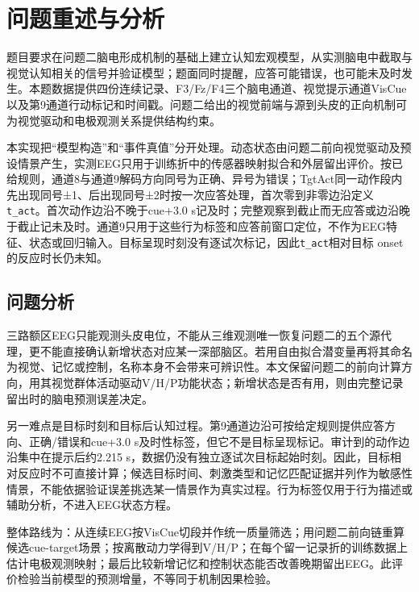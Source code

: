 \hypertarget{ux95eeux9898ux91cdux8ff0ux4e0eux5206ux6790}{%
\section{问题重述与分析}\label{ux95eeux9898ux91cdux8ff0ux4e0eux5206ux6790}}

题目要求在问题二脑电形成机制的基础上建立认知宏观模型，从实测脑电中截取与视觉认知相关的信号并验证模型；题面同时提醒，应答可能错误，也可能未及时发生\cite{problem2026}。本题数据提供四份连续记录、F3/Fz/F4三个脑电通道、视觉提示通道VisCue以及第9通道行动标记和时间戳。问题二给出的视觉前端与源到头皮的正向机制可为视觉驱动和电极观测关系提供结构约束。

本实现把``模型构造''和``事件真值''分开处理。动态状态由问题二前向视觉驱动及预设情景产生，实测EEG只用于训练折中的传感器映射拟合和外层留出评价。按已给规则，通道8与通道9解码方向同号为正确、异号为错误；TgtAct同一动作段内先出现同号±1、后出现同号±2时按一次应答处理，首次零到非零边沿定义\texttt{t\_act}。首次动作边沿不晚于cue+3.0 s记及时；完整观察到截止而无应答或边沿晚于截止记未及时。通道9只用于这些行为标签和应答前窗口定位，不作为EEG特征、状态或回归输入。目标呈现时刻没有逐试次标记，因此\texttt{t\_act}相对目标 onset 的反应时长仍未知。

\hypertarget{ux95eeux9898ux5206ux6790}{%
\subsection{问题分析}\label{ux95eeux9898ux5206ux6790}}

三路额区EEG只能观测头皮电位，不能从三维观测唯一恢复问题二的五个源代理，更不能直接确认新增状态对应某一深部脑区。若用自由拟合潜变量再将其命名为视觉、记忆或控制，名称本身不会带来可辨识性。本文保留问题二的前向计算方向，用其视觉群体活动驱动V/H/P功能状态；新增状态是否有用，则由完整记录留出时的脑电预测误差决定。

另一难点是目标时刻和目标后认知过程。第9通道边沿可按给定规则提供应答方向、正确/错误和cue+3.0 s及时性标签，但它不是目标呈现标记。审计到的动作边沿集中在提示后约2.215 s，数据仍没有独立逐试次目标起始时刻。因此，目标相对反应时不可直接计算；候选目标时间、刺激类型和记忆匹配证据并列作为敏感性情景，不能依据验证误差挑选某一情景作为真实过程。行为标签仅用于行为描述或辅助分析，不进入EEG状态方程。

整体路线为：从连续EEG按VisCue切段并作统一质量筛选；用问题二前向链重算候选cue-target场景；按离散动力学得到V/H/P；在每个留一记录折的训练数据上估计电极观测映射；最后比较新增记忆和控制状态能否改善晚期留出EEG。此评价检验当前模型的预测增量，不等同于机制因果检验。

